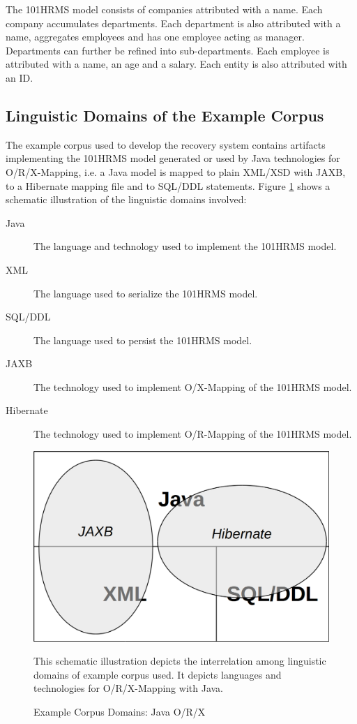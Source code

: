 The \gls{101HRMS} model consists of companies attributed with a name.
Each company accumulates departments.
Each department is also attributed with a name, aggregates employees and has one employee acting as manager.
Departments can further be refined into sub-departments.
Each employee is attributed with a name, an age and a salary.
Each entity is also attributed with an ID.

\subsection{Linguistic Domains of the Example Corpus}
The example corpus used to develop the recovery system contains artifacts implementing the \gls{101HRMS} model generated or used by \gls{Java} technologies for \gls{O/R/X-Mapping}, i.e. a \gls{Java} model is mapped to plain \gls{XML}/\gls{XSD} with \gls{JAXB}, to a \gls{Hibernate} mapping file and to \gls{SQL}/\gls{DDL} statements.
Figure \ref{figure:ExampleCorpusJORXDomains} shows a schematic illustration of the linguistic domains involved:
\begin{description}

\item[Java]
The language and technology used to implement the \gls{101HRMS} model.

\item[XML]
The language used to serialize the \gls{101HRMS} model.

\item[SQL/DDL]
The language used to persist the \gls{101HRMS} model.

\item[JAXB]
The technology used to implement \gls{O/X-Mapping} of the \gls{101HRMS} model.

\item[Hibernate]
The technology used to implement \gls{O/R-Mapping} of the \gls{101HRMS} model.

\end{description}

\begin{figure}[h!]
\begin{center}
\includegraphics[width=.6\textwidth]{images/JORXDomains.png}
\end{center}
{
\scriptsize 
This schematic illustration depicts the interrelation among linguistic domains of example corpus used.
It depicts languages and technologies for \gls{O/R/X-Mapping} with \gls{Java}.
}
\caption{Example Corpus Domains: Java O/R/X}
\label{figure:ExampleCorpusJORXDomains}
\end{figure}

